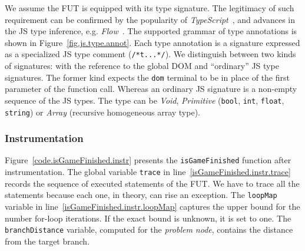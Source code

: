 We assume the FUT is equipped with its type signature. The legitimacy of such requirement can be confirmed by the popularity of \emph{TypeScript}~\cite{typescript}, and advances in the JS type inference, e.g. \emph{Flow}~\cite{flow}. The supported grammar of type annotations is shown in Figure~\ref{fig.js.type.annot}. Each type annotation is a signature expressed as a specialized JS type comment (\texttt{/*t...*/}). We distinguish between two kinds of signatures: with the reference to the global DOM and ``ordinary'' JS type signatures. The former kind expects the \texttt{dom} terminal to be in place of the first parameter of the function call. Whereas an ordinary JS signature is a non-empty sequence of the JS types. The type can be \emph{Void}, \emph{Primitive} (\texttt{bool}, \texttt{int}, \texttt{float}, \texttt{string}) or \emph{Array} (recursive homogeneous array type).

\subsubsection{Instrumentation}
\label{sub.sec.instrument}

Figure~\ref{code.isGameFinished.instr} presents the \texttt{isGameFinished} function after instrumentation. The global variable \texttt{trace} in line~\ref{isGameFinished.instr.trace} records the sequence of executed statements of the FUT. We have to trace all the statements because each one, in theory, can rise an exception. The \texttt{loopMap} variable in line~\ref{isGameFinished.instr.loopMap} captures the upper bound for the number for-loop iterations. If the exact bound is unknown, it is set to one. The \texttt{branchDistance} variable, computed for the \emph{problem node}, contains the distance~\cite{tracey1998automated} from the target branch.


